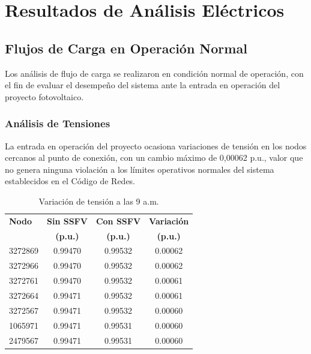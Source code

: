 \chapter{Resultados de Análisis Eléctricos}

\section{Flujos de Carga en Operación Normal}

Los análisis de flujo de carga se realizaron en condición normal de operación, con el fin de evaluar el desempeño del sistema ante la entrada en operación del proyecto fotovoltaico.

\subsection{Análisis de Tensiones}

La entrada en operación del proyecto ocasiona variaciones de tensión en los nodos cercanos al punto de conexión, con un cambio máximo de 0,00062 p.u., valor que no genera ninguna violación a los límites operativos normales del sistema establecidos en el Código de Redes.

\begin{table}[H]
    \centering
    \caption{Variación de tensión a las 9 a.m.}
    \begin{tabular}{lccc}
    \toprule
    \textbf{Nodo} & \textbf{Sin SSFV} & \textbf{Con SSFV} & \textbf{Variación} \\
    \textbf{} & \textbf{(p.u.)} & \textbf{(p.u.)} & \textbf{(p.u.)} \\
    \midrule
    3272869 & 0.99470 & 0.99532 & 0.00062 \\
    3272966 & 0.99470 & 0.99532 & 0.00062 \\
    3272761 & 0.99470 & 0.99532 & 0.00061 \\
    3272664 & 0.99471 & 0.99532 & 0.00061 \\
    3272567 & 0.99471 & 0.99532 & 0.00060 \\
    1065971 & 0.99471 & 0.99531 & 0.00060 \\
    2479567 & 0.99471 & 0.99531 & 0.00060 \\
    \bottomrule
    \end{tabular}
\end{table}

